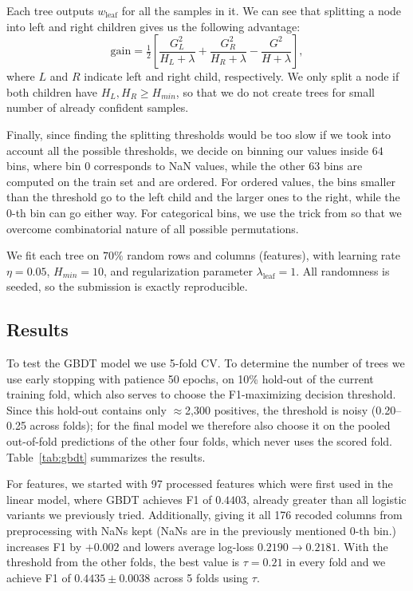 \documentclass[10pt,conference,compsocconf]{IEEEtran}
\begin{document}
Each tree outputs $w_\text{leaf}$ for all the samples in it. We can see that splitting a node into left and right children gives us the following advantage:
\begin{equation*}
  \text{gain} = \tfrac12\left[\frac{G_L^2}{H_L+\lambda} + \frac{G_R^2}{H_R+\lambda} - \frac{G^2}{H+\lambda}\right],
\end{equation*}
where $L$ and $R$ indicate left and right child, respectively. We only split a node if both children have $H_L, H_R \geq H_{min}$, so that we do not create trees for small number of already confident samples.

Finally, since finding the splitting thresholds would be too slow if we took into account all the possible thresholds, we decide on binning our values inside $64$ bins, where bin $0$ corresponds to NaN values, while the other $63$ bins are computed on the train set and are ordered. For ordered values, the bins smaller than the threshold go to the left child and the larger ones to the right, while the $0$-th bin can go either way. For categorical bins, we use the trick from \cite{ke17lightgbm} so that we overcome combinatorial nature of all possible permutations. 

We fit each tree on $70\%$ random rows and columns (features), with learning rate $\eta = 0.05$, $H_{min} = 10$, and regularization parameter $\lambda_{\text{leaf}} = 1$. All randomness is seeded, so the submission is exactly reproducible.

\subsection{Results}

To test the GBDT model we use 5-fold CV. To determine the number of trees we use early stopping with patience 50 epochs, on 10\% hold-out of the current training fold, which also serves to choose the F1-maximizing decision threshold. Since this hold-out contains only $\approx$2{,}300 positives, the threshold is noisy (0.20--0.25 across folds); for the final model we therefore also choose it on the pooled out-of-fold predictions of the other four folds, which never uses the scored fold. Table~\ref{tab:gbdt} summarizes the results.

For features, we started with 97 processed features which were first used in the linear model, where GBDT achieves F1 of $0.4403$, already greater than all logistic variants we previously tried. Additionally, giving it all 176 recoded columns from preprocessing with NaNs kept (NaNs are in the previously mentioned $0$-th bin.) increases F1 by $+0.002$ and lowers average log-loss $0.2190 \rightarrow 0.2181$. With the threshold from the other folds, the best value is $\tau = 0.21$ in every fold and we achieve F1 of $0.4435 \pm 0.0038$ across 5 folds using $\tau$.
\end{document}
